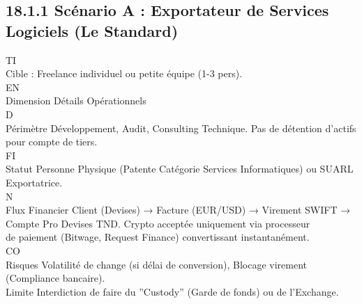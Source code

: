 \subsection{18.1.1 Scénario A : Exportateur de Services Logiciels (Le Standard)}
\vspace{0.5em}
\vspace{0.5em}
\vspace{0.5em}
\vspace{0.5em}
TI\\
Cible : Freelance individuel ou petite équipe (1-3 pers).\\
\vspace{0.5em}
\vspace{0.5em}
\vspace{0.5em}
\vspace{0.5em}
EN\\
Dimension      Détails Opérationnels\\
\vspace{0.5em}
\vspace{0.5em}
\vspace{0.5em}
\vspace{0.5em}
D\\
Périmètre      Développement, Audit, Consulting Technique. Pas de détention d’actifs pour compte de tiers.\\
\vspace{0.5em}
\vspace{0.5em}
\vspace{0.5em}
\vspace{0.5em}
FI\\
Statut         Personne Physique (Patente Catégorie Services Informatiques) ou SUARL Exportatrice.\\
\vspace{0.5em}
\vspace{0.5em}
N\\
Flux Financier Client (Devises) → Facture (EUR/USD) → Virement SWIFT → Compte Pro Devises TND. Crypto acceptée uniquement via processeur\\
de paiement (Bitwage, Request Finance) convertissant instantanément.\\
CO\\
Risques        Volatilité de change (si délai de conversion), Blocage virement (Compliance bancaire).\\
Limite         Interdiction de faire du ”Custody” (Garde de fonds) ou de l’Exchange.\\
\vspace{0.5em}
\vspace{0.5em}
\vspace{0.5em}
